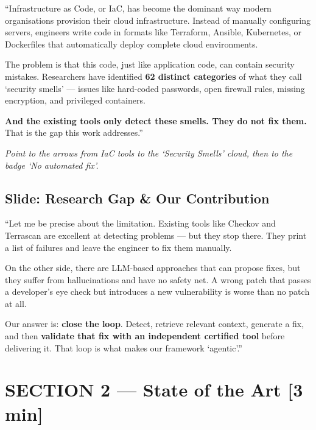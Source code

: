\documentclass[12pt,a4paper]{article}
\newcommand{\timing}[1]{{\color{slidegold}\textbf{[#1]}}}
\newcommand{\cue}[1]{{\color{cuegreen}\textit{#1}}}
\begin{document}
\begin{saybox}
``Infrastructure as Code, or IaC, has become the dominant way modern organisations
provision their cloud infrastructure. Instead of manually configuring servers,
engineers write code in formats like Terraform, Ansible, Kubernetes, or Dockerfiles
that automatically deploy complete cloud environments.

The problem is that this code, just like application code, can contain security mistakes.
Researchers have identified \textbf{62 distinct categories} of what they call `security smells' ---
issues like hard-coded passwords, open firewall rules, missing encryption, and privileged containers.

\textbf{And the existing tools only detect these smells. They do not fix them.}
That is the gap this work addresses.''
\end{saybox}

\cue{Point to the arrows from IaC tools to the `Security Smells' cloud, then to the badge `No automated fix'.}

\subsection{Slide: Research Gap \& Our Contribution}

\begin{saybox}
``Let me be precise about the limitation. Existing tools like Checkov and Terrascan are
excellent at detecting problems --- but they stop there. They print a list of failures
and leave the engineer to fix them manually.

On the other side, there are LLM-based approaches that can propose fixes,
but they suffer from hallucinations and have no safety net. A wrong patch
that passes a developer's eye check but introduces a new vulnerability is worse than no patch at all.

Our answer is: \textbf{close the loop}. Detect, retrieve relevant context, generate a fix,
and then \textbf{validate that fix with an independent certified tool} before delivering it.
That loop is what makes our framework `agentic'.''
\end{saybox}

\section{SECTION 2 --- State of the Art \timing{3 min}}
\end{document}
